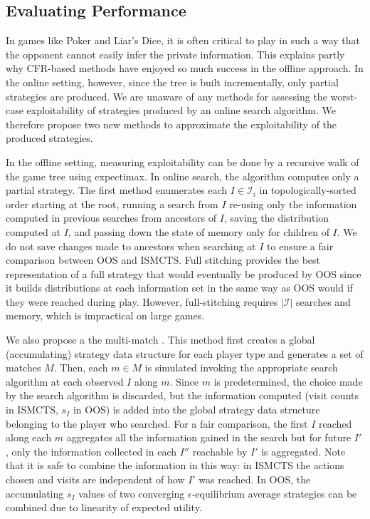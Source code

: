 \documentclass{aamas2015}
\newcommand{\cI}{\mathcal{I}}
\newcommand{\defword}[1]{\textbf{\boldmath{#1}}}
\begin{document}
\subsection{Evaluating Performance}

In games like Poker and Liar's Dice, it is often critical to play in such a way that the opponent 
cannot easily infer the private information. This explains partly why CFR-based methods have 
enjoyed so much success in the offline approach. 
In the online setting, however, since the tree is built incrementally, only partial strategies
are produced. 
We are unaware of any methods for assessing the worst-case exploitability of strategies 
produced by an online search algorithm. 
We therefore propose two new methods to approximate the exploitability of the produced strategies. 

In the offline setting, measuring exploitability can be done by a recursive walk of the game 
tree using expectimax. In online search, the algorithm computes only 
a partial strategy. 
The first \defword{full stitching} method 
enumerates each $I \in \cI_i$ in topologically-sorted order starting at the root, 
running a search from $I$ re-using only the information computed in previous searches from ancestors of $I$, saving the 
distribution computed at $I$, and passing down the state of memory only for children of $I$. 
We do not save changes made to ancestors when searching at $I$ to ensure 
a fair comparison between OOS and ISMCTS. Full stitching provides the best representation of a full strategy
that would eventually be produced by OOS since it builds distributions at each information set in the 
same way as OOS would if they were reached during play.
However, full-stitching requires $|\cI|$ searches and memory, which is impractical on large games. 

We also propose a the multi-match \defword{aggregate method}. 
This method first creates a global (accumulating) strategy data structure for each player type and generates a 
set of matches $M$. Then, each $m \in M$ is simulated invoking the appropriate search algorithm at each observed 
$I$ along $m$. 
Since $m$ is predetermined, the choice made by the search algorithm is discarded, but the information computed 
(visit counts in ISMCTS, $s_I$ in OOS) is added into the global strategy data structure belonging to the player
who searched. 
For a fair comparison, the first $I$ reached along each $m$ aggregates all the information gained in the search 
but for future $I'$, only the information collected in each $I''$ reachable by $I'$ is aggregated.
Note that it is safe to combine the information in this way: in ISMCTS the actions chosen and visits are independent of 
how $I'$ was reached. In OOS, the accumulating $s_I$ values of two converging $\epsilon$-equilibrium average 
strategies can be combined due to linearity of expected utility. 
\end{document}
